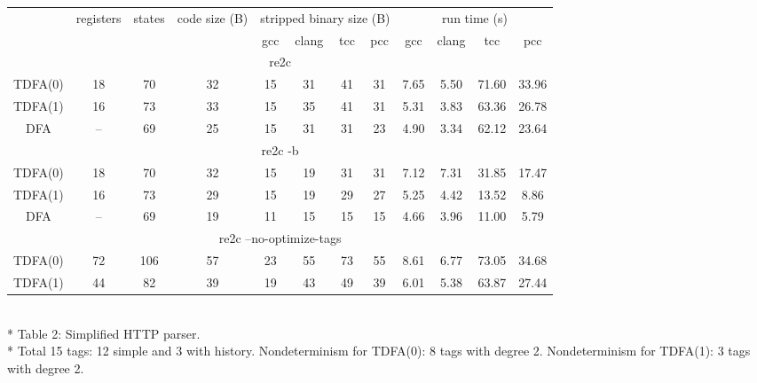 \documentclass{article}
\theoremstyle{definition}
\begin{document}
\begin{center}
    \bigskip
    \begin{tabular}{|c|ccccccccccc|}
    \hline
    & registers & states & code size (B) & \multicolumn{4}{c}{stripped binary size (B)} & \multicolumn{4}{c|}{run time (s)} \\
    & & &
        & gcc & clang & tcc & pcc
        & gcc & clang & tcc & pcc \\
    \hline \hline
    \multicolumn{12}{|c|}{re2c} \\
    \hline
    TDFA(0) & 18 & 70 & 32 & 15 & 31 & 41 & 31 & 7.65 & 5.50 & 71.60 & 33.96 \\
    TDFA(1) & 16 & 73 & 33 & 15 & 35 & 41 & 31 & 5.31 & 3.83 & 63.36 & 26.78 \\
    DFA     & -- & 69 & 25 & 15 & 31 & 31 & 23 & 4.90 & 3.34 & 62.12 & 23.64 \\
    \hline \hline
    \multicolumn{12}{|c|}{re2c -b} \\
    \hline
    TDFA(0) & 18 & 70 & 32 & 15 & 19 & 31 & 31 & 7.12 & 7.31 & 31.85 & 17.47 \\
    TDFA(1) & 16 & 73 & 29 & 15 & 19 & 29 & 27 & 5.25 & 4.42 & 13.52 &  8.86 \\
    DFA     & -- & 69 & 19 & 11 & 15 & 15 & 15 & 4.66 & 3.96 & 11.00 &  5.79 \\
    \hline \hline
    \multicolumn{12}{|c|}{re2c --no-optimize-tags} \\
    \hline
    TDFA(0) & 72 & 106 & 57 & 23 & 55 & 73 & 55 & 8.61 & 6.77 & 73.05 & 34.68 \\
    TDFA(1) & 44 &  82 & 39 & 19 & 43 & 49 & 39 & 6.01 & 5.38 & 63.87 & 27.44 \\
    \hline
    \end{tabular}\\*
    \medskip
    Table 2: Simplified HTTP parser.\\*
    \medskip
    \footnotesize{Total 15 tags: 12 simple and 3 with history.
    Nondeterminism for TDFA(0): 8 tags with degree 2.
    Nondeterminism for TDFA(1): 3 tags with degree 2.}
    \bigskip
\end{center}
\end{document}
